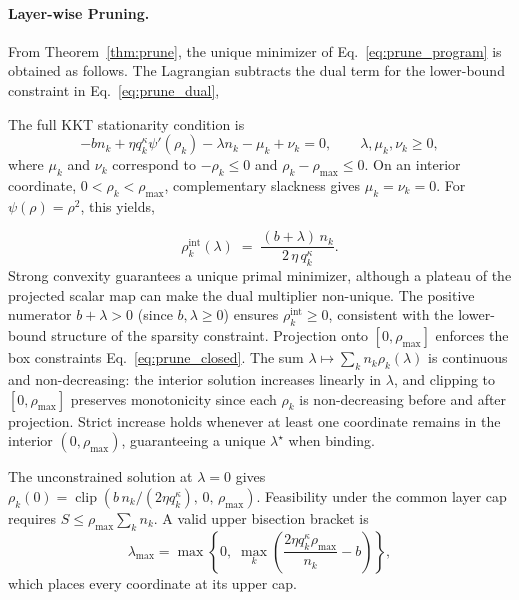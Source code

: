 \documentclass[accepted]{uai2026}%
\theoremstyle{remark}%
\begin{document}
\paragraph{Layer-wise Pruning.}

From Theorem~\ref{thm:prune}, the unique minimizer of Eq.~\eqref{eq:prune_program} is obtained as follows.
The Lagrangian subtracts the dual term for the lower-bound constraint in Eq.~\eqref{eq:prune_dual},



The full KKT stationarity condition is
\[
-bn_k+\eta q_k^\kappa\psi'(\rho_k)-\lambda n_k-\mu_k+\nu_k=0,
\qquad \lambda,\mu_k,\nu_k\ge0,
\]
where $\mu_k$ and $\nu_k$ correspond to $-\rho_k\le0$ and
$\rho_k-\rho_{\max}\le0$. On an interior coordinate,
$0<\rho_k<\rho_{\max}$, complementary slackness gives
$\mu_k=\nu_k=0$. For $\psi(\rho)=\rho^2$, this yields,

\[
  \rho_k^{\mathrm{int}}(\lambda)
  \;=\;
  \frac{(b+\lambda)\,n_k}{2\,\eta\,q_k^{\kappa}}.
\]
Strong convexity guarantees a unique primal minimizer,
although a plateau of the projected scalar map can make the dual multiplier
non-unique.
The positive numerator $b + \lambda > 0$ (since $b,\lambda \ge 0$)
ensures $\rho_k^{\mathrm{int}} \ge 0$, consistent with the lower-bound
structure of the sparsity constraint.
Projection onto $[0,\rho_{\max}]$ enforces the box constraints Eq.~\eqref{eq:prune_closed}.%
The sum $\lambda \mapsto \sum_k n_k\rho_k(\lambda)$ is continuous and
non-decreasing: the interior solution increases linearly in $\lambda$,
and clipping to $[0,\rho_{\max}]$ preserves monotonicity since each $\rho_k$
is non-decreasing before and after projection.
Strict increase holds whenever at least one coordinate remains in the
interior $(0,\rho_{\max})$, guaranteeing a unique $\lambda^\star$ when binding.

The unconstrained solution at $\lambda = 0$ gives
$\rho_k(0) = \operatorname{clip}(b\,n_k / (2\eta q_k^\kappa),\,0,\,\rho_{\max})$.
Feasibility under the common layer cap requires
$S\le\rho_{\max}\sum_k n_k$. A valid upper bisection bracket is
\[
\lambda_{\max}
=
\max\!\left\{0,\;\max_k\left(\frac{2\eta q_k^\kappa\rho_{\max}}{n_k}-b\right)\right\},
\]
which places every coordinate at its upper cap.
\end{document}
